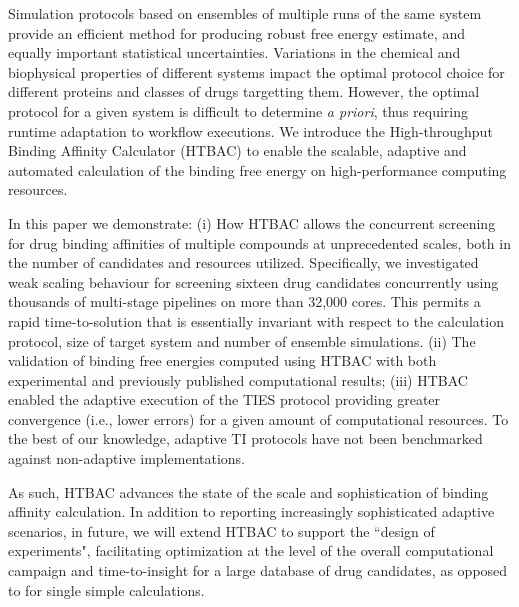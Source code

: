 

Simulation protocols based on ensembles of multiple runs of the same system
provide an efficient method for producing robust free energy estimate, and
equally important statistical uncertainties. Variations in the chemical and
biophysical properties of different systems impact the optimal protocol choice
for different proteins and classes of drugs targetting them. However, the optimal protocol for a given system 
is difficult to determine {\it a priori}, thus requiring runtime adaptation
to workflow executions. We introduce the High-throughput Binding Affinity
Calculator (HTBAC) to enable the scalable, adaptive and automated calculation
of the binding free energy on high-performance computing resources.

In this paper we demonstrate: (i) How HTBAC allows the concurrent screening
for drug binding affinities of multiple compounds at unprecedented scales,
both in the number of candidates and resources utilized. Specifically, we
investigated weak scaling behaviour for screening sixteen drug candidates
concurrently using thousands of multi-stage pipelines on more than 32,000
cores. This permits a rapid time-to-solution that is essentially invariant
with respect to the calculation protocol, size of target system and number
of ensemble simulations. (ii) The validation of binding free energies computed
using HTBAC with both experimental and previously published computational
results; (iii) HTBAC enabled the adaptive execution of the TIES protocol
providing greater convergence (i.e., lower errors) for a given amount of
computational resources. To the best of our knowledge, adaptive TI protocols
have not been benchmarked against non-adaptive implementations.





As such, HTBAC advances the state of the scale and sophistication of binding
affinity calculation. In addition to reporting increasingly sophisticated
adaptive scenarios, in future, we will extend HTBAC to support the ``design of
experiments", facilitating optimization at the level of the overall
computational campaign and time-to-insight for a large database of drug
candidates, as opposed to for single simple calculations.


